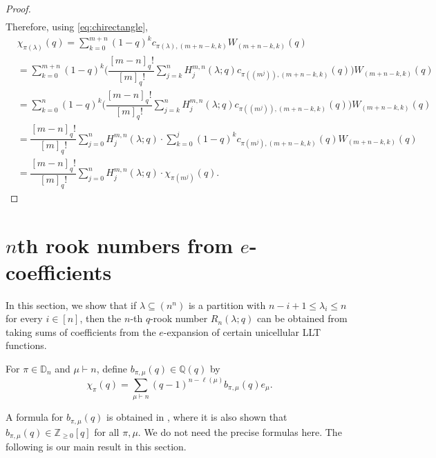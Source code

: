 \documentclass[12pt,reqno]{amsart}
\theoremstyle{plain}
\theoremstyle{definition}
\theoremstyle{remark}
\theoremstyle{example}
\numberwithin{equation}{section}
\newcommand\QQ{\mathbb{Q}}
\newcommand\ZZ{\mathbb{Z}}
\newcommand{\DD}{\mathbb{D}}
\begin{document}
\begin{proof}
\begin{align*}
	\end{align*}
	Therefore, using \eqref{eq:chirectangle}, \begin{align*}
		&\chi_{\pi(\lambda)}(q) = \sum_{k=0}^{m+n} (1-q)^{k} c_{\pi(\lambda),(m+n-k,k)} W_{(m+n-k,k)}(q) \\
		&=  \sum_{k=0}^{m+n} (1-q)^{k} \bigg(\dfrac{[m-n]_q!}{[m]_q!} \sum_{j=k}^{n} H_j^{m,n}(\lambda;q) c_{\pi((m^j)),(m+n-k,k)}(q)\bigg) W_{(m+n-k,k)}(q)
		\\
		&=  \sum_{k=0}^{n} (1-q)^{k} \bigg(\dfrac{[m-n]_q!}{[m]_q!} \sum_{j=k}^{n} H_j^{m,n}(\lambda;q) c_{\pi((m^j)),(m+n-k,k)}(q)\bigg) W_{(m+n-k,k)}(q)
		\\
		&= \dfrac{[m-n]_q!}{[m]_q!} \sum_{j = 0}^{n} H_j^{m,n}(\lambda;q) \cdot \sum_{k=0}^{j} (1-q)^k c_{\pi(m^j),(m+n-k,k)}(q) W_{(m+n-k,k)}(q)
		\\
		&= \dfrac{[m-n]_q!}{[m]_q!} \sum_{j=0}^{n} H^{m,n}_j(\lambda;q) \cdot \chi_{\pi(m^j)}(q).
	\end{align*}
	
\end{proof}


\section{$n$th rook numbers from $e$-coefficients}

In this section, we show that if $\lambda \subseteq (n^n)$ is a partition with $n-i+1\leq\lambda_{i}\leq n$ for every $i \in [n]$, then the $n$-th $q$-rook number $R_n(\lambda;q)$ can be obtained from taking sums of coefficients from the $e$-expansion of certain unicellular LLT functions. 

For $\pi \in \DD_n$ and $\mu \vdash n$, define $b_{\pi,\mu}(q) \in \QQ(q)$ by \begin{equation}
	\chi_\pi(q) = \sum_{\mu \vdash n} (q-1)^{n-\ell(\mu)} b_{\pi,\mu}(q) e_\mu.
\end{equation}

A formula for $b_{\pi,\mu}(q)$ is obtained in \cite[Theorem 1.3]{Abreu_Nigro_forests}, where it is also shown that $b_{\pi,\mu}(q) \in \ZZ_{\geq 0}[q]$ for all $\pi,\mu$. We do not need the precise formulas here. The following is our main result in this section.
\end{document}
